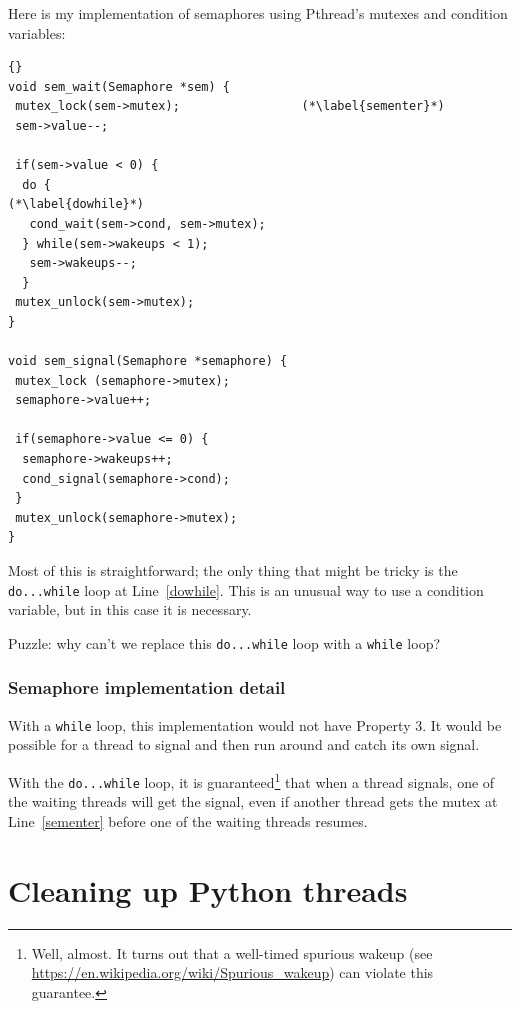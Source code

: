 \documentclass{book}
\begin{document}
Here is my implementation of semaphores using Pthread's mutexes
and condition variables:

\newpage
\begin{lstlisting}[title={}]{}
void sem_wait(Semaphore *sem) {
 mutex_lock(sem->mutex);                 (*\label{sementer}*)
 sem->value--;

 if(sem->value < 0) {
  do {                                                (*\label{dowhile}*)
   cond_wait(sem->cond, sem->mutex);
  } while(sem->wakeups < 1);
   sem->wakeups--;
  }
 mutex_unlock(sem->mutex);
}

void sem_signal(Semaphore *semaphore) {
 mutex_lock (semaphore->mutex);
 semaphore->value++;

 if(semaphore->value <= 0) {
  semaphore->wakeups++;
  cond_signal(semaphore->cond);
 }
 mutex_unlock(semaphore->mutex);
}
\end{lstlisting}

Most of this is straightforward; the only thing that might be
tricky is the {\tt do...while} loop at Line~\ref{dowhile}.
This is an unusual way to use a condition variable, but in
this case it is necessary.

Puzzle: why can't we replace this {\tt do...while} loop
with a {\tt while} loop?


\subsection{Semaphore implementation detail}

With a {\tt while} loop, this implementation would not have
Property 3.  It would be possible for a thread to signal
and then run around and catch its own signal.

With the {\tt do...while} loop, it is guaranteed\footnote{Well,
    almost.  It turns out that a well-timed spurious wakeup (see
    \url{https://en.wikipedia.org/wiki/Spurious_wakeup}) can violate this
    guarantee.} that when a thread signals, one of the waiting threads
will get the signal, even if another thread gets the mutex at
Line~\ref{sementer} before one of the waiting threads resumes.





\appendix

\chapter{Cleaning up Python threads}
\label{cleanup}
\end{document}
